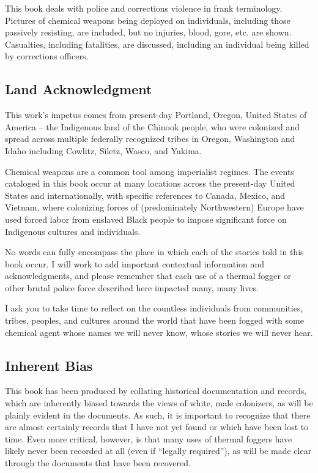 \documentclass[
  11pt,
]{krantz}
\begin{document}
This book deals with police and corrections violence in frank terminology.
Pictures of chemical weapons being deployed on individuals, including those passively resisting, are included, but no injuries, blood, gore, etc. are shown.
Casualties, including fatalities, are discussed, including an individual being killed by corrections officers.

\hypertarget{land-acknowledgment}{%
\subsection*{Land Acknowledgment}\label{land-acknowledgment}}


This work's impetus comes from present-day Portland, Oregon, United States of America -- the Indigenous land of the Chinook people, who were colonized and spread across multiple federally recognized tribes in Oregon, Washington and Idaho including Cowlitz, Siletz, Wasco, and Yakima.

Chemical weapons are a common tool among imperialist regimes.
The events cataloged in this book occur at many locations across the present-day United States and internationally, with specific references to Canada, Mexico, and Vietnam, where colonizing forces of (predominately Northwestern) Europe have used forced labor from enslaved Black people to impose significant force on Indigenous cultures and individuals.

No words can fully encompass the place in which each of the stories told in this book occur.
I will work to add important contextual information and acknowledgments, and please remember that each use of a thermal fogger or other brutal police force described here impacted many, many lives.

I ask you to take time to reflect on the countless individuals from communities, tribes, peoples, and cultures around the world that have been fogged with some chemical agent whose names we will never know, whose stories we will never hear.

\hypertarget{inherent-bias}{%
\subsection*{Inherent Bias}\label{inherent-bias}}


This book has been produced by collating historical documentation and records, which are inherently biased towards the views of white, male colonizers, as will be plainly evident in the documents.
As such, it is important to recognize that there are almost certainly records that I have not yet found or which have been lost to time.
Even more critical, however, is that many uses of thermal foggers have likely never been recorded at all (even if ``legally required''), as will be made clear through the documents that have been recovered.
\end{document}
